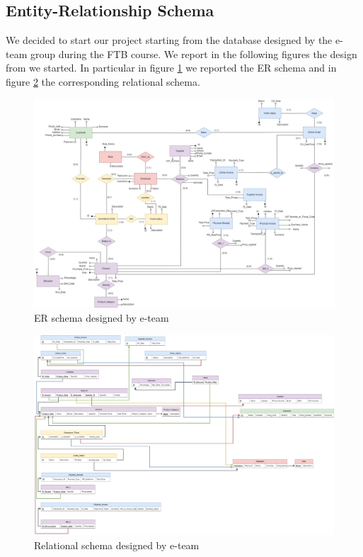 \subsection{Entity-Relationship Schema}

We decided to start our project starting from the database designed by the e-team group during the FTB course. We report in the following figures the design from we started. In particular in figure \ref{er_original} we reported the ER schema and in figure \ref{ls_original} the corresponding relational schema.

\begin{figure}[H]
\centering
\includegraphics[width=17cm]{Schemas/ER_original.jpg}
\caption{ER schema designed by e-team}
\label{er_original}
\end{figure}

\begin{figure}[H]
\centering
\includegraphics[width=17cm]{Schemas/LogicRS_original.jpg}
\caption{Relational schema designed by e-team}
\label{ls_original}
\end{figure}

